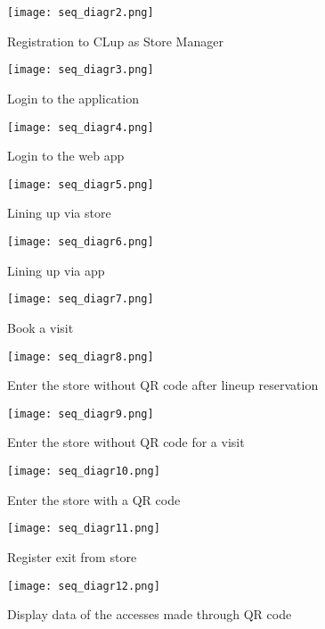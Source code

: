 \begin{figure}
    \centering
    \texttt{[image: seq\_diagr2.png]}
    \caption{Registration to CLup as Store Manager}
\end{figure}

\begin{figure}
    \centering
    \texttt{[image: seq\_diagr3.png]}
    \caption{Login to the application}
\end{figure}

\begin{figure}
    \centering
    \texttt{[image: seq\_diagr4.png]}
    \caption{Login to the web app}
\end{figure}

\begin{figure}
    \centering
    \texttt{[image: seq\_diagr5.png]}
    \caption{Lining up via store}
\end{figure}

\begin{figure}
    \centering
    \texttt{[image: seq\_diagr6.png]}
    \caption{Lining up via app}
\end{figure}

\begin{figure}
    \centering
    \texttt{[image: seq\_diagr7.png]}
    \caption{Book a visit}
\end{figure}

\begin{figure}
    \centering
    \texttt{[image: seq\_diagr8.png]}
    \caption{Enter the store without QR code after lineup reservation}
\end{figure}

\begin{figure}
    \centering
    \texttt{[image: seq\_diagr9.png]}
    \caption{Enter the store without QR code for a visit}
\end{figure}

\begin{figure}
    \centering
    \texttt{[image: seq\_diagr10.png]}
    \caption{Enter the store with a QR code}
\end{figure}

\begin{figure}
    \centering
    \texttt{[image: seq\_diagr11.png]}
    \caption{Register exit from store}
\end{figure}

\begin{figure}
    \centering
    \texttt{[image: seq\_diagr12.png]}
    \caption{Display data of the accesses made through QR code}
\end{figure}

\clearpage
